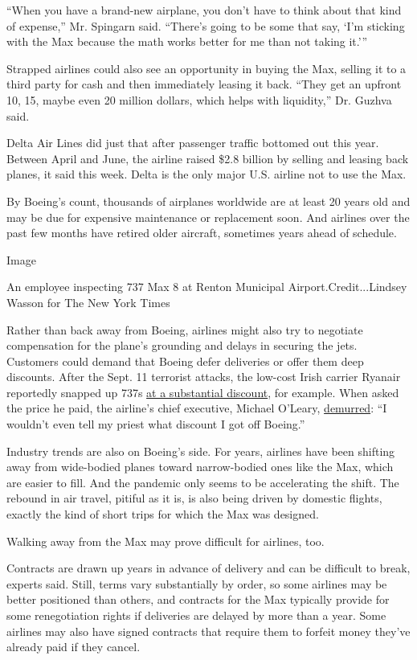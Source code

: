 ``When you have a brand-new airplane, you don't have to think about that
kind of expense,'' Mr. Spingarn said. ``There's going to be some that
say, `I'm sticking with the Max because the math works better for me
than not taking it.'''

Strapped airlines could also see an opportunity in buying the Max,
selling it to a third party for cash and then immediately leasing it
back. ``They get an upfront 10, 15, maybe even 20 million dollars, which
helps with liquidity,'' Dr. Guzhva said.

Delta Air Lines did just that after passenger traffic bottomed out this
year. Between April and June, the airline raised \$2.8 billion by
selling and leasing back planes, it said this week. Delta is the only
major U.S. airline not to use the Max.

By Boeing's count, thousands of airplanes worldwide are at least 20
years old and may be due for expensive maintenance or replacement soon.
And airlines over the past few months have retired older aircraft,
sometimes years ahead of schedule.

Image

An employee inspecting 737 Max 8 at Renton Municipal
Airport.Credit...Lindsey Wasson for The New York Times

Rather than back away from Boeing, airlines might also try to negotiate
compensation for the plane's grounding and delays in securing the jets.
Customers could demand that Boeing defer deliveries or offer them deep
discounts. After the Sept. 11 terrorist attacks, the low-cost Irish
carrier Ryanair reportedly snapped up 737s
\href{http://news.bbc.co.uk/2/hi/business/1779700.stm}{at a substantial
discount}, for example. When asked the price he paid, the airline's
chief executive, Michael O'Leary,
\href{http://news.bbc.co.uk/2/hi/business/2962698.stm}{demurred}: ``I
wouldn't even tell my priest what discount I got off Boeing.''

Industry trends are also on Boeing's side. For years, airlines have been
shifting away from wide-bodied planes toward narrow-bodied ones like the
Max, which are easier to fill. And the pandemic only seems to be
accelerating the shift. The rebound in air travel, pitiful as it is, is
also being driven by domestic flights, exactly the kind of short trips
for which the Max was designed.

Walking away from the Max may prove difficult for airlines, too.

Contracts are drawn up years in advance of delivery and can be difficult
to break, experts said. Still, terms vary substantially by order, so
some airlines may be better positioned than others, and contracts for
the Max typically provide for some renegotiation rights if deliveries
are delayed by more than a year. Some airlines may also have signed
contracts that require them to forfeit money they've already paid if
they cancel.

